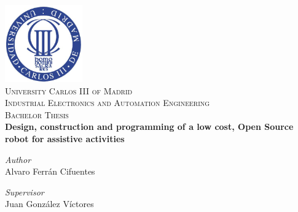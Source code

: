 \begin{titlepage}

\begin{center}


\includegraphics[width=0.25\textwidth]{images/uc3m.jpg}\\[2cm]    
\textsc{\huge University Carlos III of Madrid}\\[0.5cm]
\textsc{\Large Industrial Electronics and Automation Engineering}\\[0.5cm]
\textsc{\large Bachelor Thesis}\\[4cm]

{\LARGE \bfseries{Design, construction and programming of a low cost, Open Source robot for assistive activities}\\[4.5cm]}
 
 
\end{center}

\begin{minipage}{0.55\textwidth}
\begin{flushleft} \large
\emph{Author}\\
Alvaro Ferrán Cifuentes\\

\end{flushleft}
\end{minipage}
\begin{minipage}{0.4\textwidth}
\begin{flushright} \large
\emph{Supervisor}\\
Juan González Víctores

\end{flushright}\end{minipage}\vfill

\vfill
















\end{titlepage}